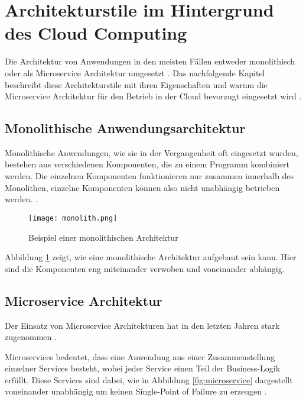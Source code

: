\section{Architekturstile im Hintergrund des Cloud Computing}
\label{sec:architekturstile}
Die Architektur von Anwendungen in den meisten Fällen entweder monolithisch oder als Microservice Architektur umgesetzt \cite[Vgl.][S. 150]{Gos2020}. Das nachfolgende Kapitel beschreibt diese Architekturstile mit ihren Eigenschaften und warum die Microservice Architektur für den Betrieb in der Cloud bevorzugt eingesetzt wird \cite[Vgl.][S. 1]{Villamizar2015}.

\subsection{Monolithische Anwendungsarchitektur}
Monolithische Anwendungen, wie sie in der Vergangenheit oft eingesetzt wurden, bestehen aus verschiedenen Komponenten, die zu einem Programm kombiniert werden. Die einzelnen Komponenten funktionieren nur zusammen innerhalb des Monolithen, einzelne Komponenten können also nicht unabhängig betrieben werden. \cite[Vgl.][S. 1]{Gos2020}.

\begin{figure}[H]
    \centering
    \texttt{[image: monolith.png]}
    \caption{Beispiel einer monolithischen Architektur \cite[Nachbildung angelehnt an][S. 150]{Gos2020}}
    \label{fig:monolith}
\end{figure}

Abbildung \ref{fig:monolith} zeigt, wie eine monolithische Architektur aufgebaut sein kann. Hier sind die Komponenten eng miteinander verwoben und voneinander abhängig.
\pagebreak

\subsection{Microservice Architektur}
Der Einsatz von Microservice Architekturen hat in den letzten Jahren stark zugenommen \cite[Vgl.][S. 150]{Gos2020}.

Microservices bedeutet, dass eine Anwendung aus einer Zusammenstellung einzelner Services besteht, wobei jeder Service einen Teil der Business-Logik erfüllt. Diese Services sind dabei, wie in Abbildung \ref{fig:microservice} dargestellt voneinander unabhängig um keinen Single-Point of Failure zu erzeugen \cite[Vgl.][S. 150]{Gos2020}\cite[Vgl.][]{Janssen2021}\cite[Vgl.][]{Fowler2014}.

